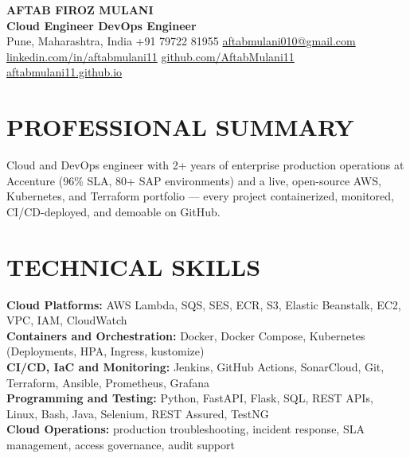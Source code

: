\documentclass[10pt,a4paper]{article}
\newcommand{\skill}[2]{%
  \textbf{\color{brandblue}#1:} #2\\[1pt]%
}
\begin{document}
\small

\begin{center}
  {\fontsize{20}{22}\selectfont\bfseries\color{brandblue}AFTAB FIROZ MULANI}\\[2pt]
  {\normalsize\bfseries Cloud Engineer \textcolor{rulegray}{\textbar{}} DevOps Engineer}\\[3pt]
  {\small Pune, Maharashtra, India \textcolor{rulegray}{\textbar{}} +91 79722 81955 \textcolor{rulegray}{\textbar{}}
  \href{mailto:aftabmulani010@gmail.com}{\textcolor{brandblue}{aftabmulani010@gmail.com}}}\\[1pt]
  {\small \href{https://www.linkedin.com/in/aftabmulani11}{\textcolor{brandblue}{linkedin.com/in/aftabmulani11}}
  \textcolor{rulegray}{\textbar{}}
  \href{https://github.com/AftabMulani11}{\textcolor{brandblue}{github.com/AftabMulani11}}
  \textcolor{rulegray}{\textbar{}}
  \href{https://aftabmulani11.github.io/}{\textcolor{brandblue}{aftabmulani11.github.io}}}
\end{center}
\vspace{2pt}

\section{PROFESSIONAL SUMMARY}
Cloud and DevOps engineer with 2+ years of enterprise production operations at Accenture (96\% SLA, 80+ SAP environments) and a live, \mbox{open-source} AWS, Kubernetes, and Terraform portfolio --- every project containerized, monitored, CI/CD-deployed, and demoable on GitHub.

\section{TECHNICAL SKILLS}
\skill{Cloud Platforms}{AWS Lambda, SQS, SES, ECR, S3, Elastic Beanstalk, EC2, VPC, IAM, CloudWatch}
\skill{Containers and Orchestration}{Docker, Docker Compose, Kubernetes (Deployments, HPA, Ingress, kustomize)}
\skill{CI/CD, IaC and Monitoring}{Jenkins, GitHub Actions, SonarCloud, Git, Terraform, Ansible, Prometheus, Grafana}
\skill{Programming and Testing}{Python, FastAPI, Flask, SQL, REST APIs, Linux, Bash, Java, Selenium, REST Assured, TestNG}
\skill{Cloud Operations}{production troubleshooting, incident response, SLA management, access governance, audit support}
\end{document}
